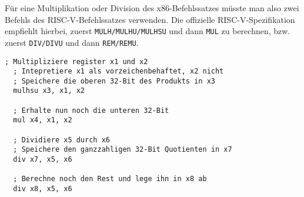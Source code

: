 Für eine Multiplikation oder Division des x86-Befehlssatzes müsste man also zwei Befehls des RISC-V-Befehlssatzes verwenden.
 Die offizielle RISC-V-Spezifikation empfiehlt hierbei, zuerst
\lstinline[style=risc-v_Assembler]!MULH/MULHU/MULHSU! und dann \lstinline[style=risc-v_Assembler]!MUL! zu berechnen, bzw. zuerst \lstinline[style=risc-v_Assembler]!DIV/DIVU!
und dann \lstinline[style=risc-v_Assembler]!REM/REMU!.

\begin{lstlisting}[style=risc-v_Assembler]
  ; Multipliziere register x1 und x2
  ; Intepretiere x1 als vorzeichenbehaftet, x2 nicht
  ; Speichere die oberen 32-Bit des Produkts in x3
  mulhsu x3, x1, x2

  ; Erhalte nun noch die unteren 32-Bit
  mul x4, x1, x2

  ; Dividiere x5 durch x6
  ; Speichere den ganzzahligen 32-Bit Quotienten in x7
  div x7, x5, x6

  ; Berechne noch den Rest und lege ihn in x8 ab
  div x8, x5, x6
\end{lstlisting}
